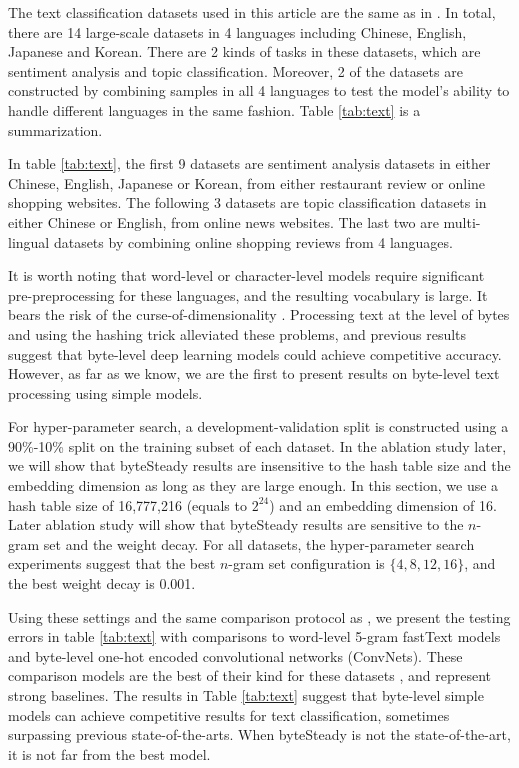 \documentclass[sigconf,review, anonymous]{acmart}
\begin{document}
The text classification datasets used in this article are the same as in \cite{ZL17}. In total, there are 14 large-scale datasets in 4 languages including Chinese, English, Japanese and Korean. There are 2 kinds of tasks in these datasets, which are sentiment analysis and topic classification. Moreover, 2 of the datasets are constructed by combining samples in all 4 languages to test the model's ability to handle different languages in the same fashion. Table \ref{tab:text} is a summarization.

In table \ref{tab:text}, the first 9 datasets are sentiment analysis datasets in either Chinese, English, Japanese or Korean, from either restaurant review or online shopping websites. The following 3 datasets are topic classification datasets in either Chinese or English, from online news websites. The last two are multi-lingual datasets by combining online shopping reviews from 4 languages.

It is worth noting that word-level or character-level models require significant pre-preprocessing for these languages, and the resulting vocabulary is large. It bears the risk of the curse-of-dimensionality \cite{BDVJ03}. Processing text at the level of bytes and using the hashing trick \cite{WDLSA09} alleviated these problems, and previous results \cite{GBVS16} \cite{ZL17} suggest that byte-level deep learning models could achieve competitive accuracy. However, as far as we know, we are the first to present results on byte-level text processing using simple models.

For hyper-parameter search, a development-validation split is constructed using a 90\%-10\% split on the training subset of each dataset. In the ablation study later, we will show that byteSteady results are insensitive to the hash table size and the embedding dimension as long as they are large enough. In this section, we use a hash table size of 16,777,216 (equals to \(2^{24}\)) and an embedding dimension of 16. Later ablation study will show that byteSteady results are sensitive to the \(n\)-gram set and the weight decay. For all datasets, the hyper-parameter search experiments suggest that the best \(n\)-gram set configuration is \(\{4,8,12,16\}\), and the best weight decay is 0.001.

Using these settings and the same comparison protocol as \cite{ZL17}, we present the testing errors in table \ref{tab:text} with comparisons to word-level 5-gram fastText models and byte-level one-hot encoded convolutional networks (ConvNets). These comparison models are the best of their kind for these datasets \cite{ZL17}, and represent strong baselines. The results in Table \ref{tab:text} suggest that byte-level simple models can achieve competitive results for text classification, sometimes surpassing previous state-of-the-arts. When byteSteady is not the state-of-the-art, it is not far from the best model.
\end{document}
